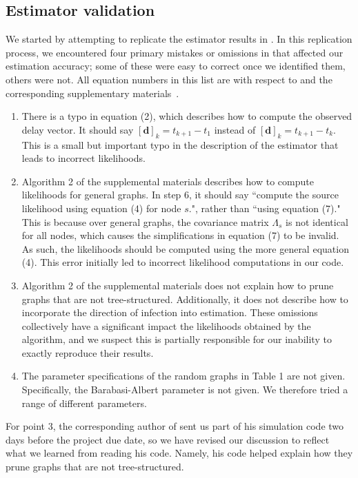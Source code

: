 \subsection{Estimator validation}
We started by attempting to replicate the estimator results in \cite{pinto}. 
In this replication process, we encountered four primary mistakes or omissions in \cite{pinto} that affected our estimation accuracy; some of these were easy to correct once we identified them, others were not. All equation numbers in this list are with respect to \cite{pinto} and the corresponding supplementary materials~\cite{supplement}.
\begin{enumerate}
\item There is a typo in equation (2), which describes how to compute the observed delay vector. It should say $[\boldsymbol d]_k=t_{k+1}-t_1$ instead of $[\boldsymbol d]_k=t_{k+1}-t_k$. This is a small but important typo in the description of the estimator that leads to incorrect likelihoods. 
\item Algorithm 2 of the supplemental materials describes how to compute likelihoods for general graphs. In step 6, it should say ``compute the source likelihood using equation (4) for node $s$.", rather than ``using equation (7)." This is because over general graphs, the covariance matrix $\Lambda_s$ is not identical for all nodes, which causes the simplifications in equation (7) to be invalid. As such, the likelihoods should be computed using the more general equation (4). This error initially led to incorrect likelihood computations in our code.
\item Algorithm 2 of the supplemental materials does not explain how to prune graphs that are not tree-structured. Additionally, it does not describe how to incorporate the direction of infection into estimation. These omissions collectively have a significant impact the likelihoods obtained by the algorithm, and we suspect this is partially responsible for our inability to exactly reproduce their results.
\item The parameter specifications of the random graphs in Table 1 are not given. Specifically, the Barabasi-Albert parameter is not given. We therefore tried a range of different parameters.
\end{enumerate}
For point 3, the corresponding author of \cite{pinto} sent us part of his simulation code two days before the project due date, so we have revised our discussion to reflect what we learned from reading his code. Namely, his code helped explain how they prune graphs that are not tree-structured. 

